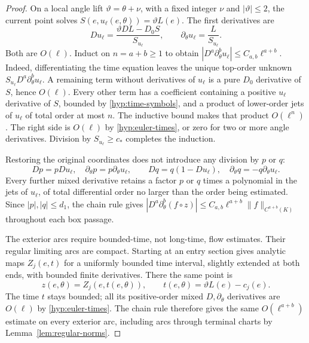 \begin{proof}
On a local angle lift $\vartheta=\theta+\nu$, with a fixed integer
$\nu$ and $|\vartheta|\le2$, the current point solves
$S(e,u_\ell(e,\theta))=\vartheta L(e)$.  The first derivatives are
\[
 Du_\ell=\frac{\vartheta DL-D_0S}{S_{u_\ell}},\qquad
 \partial_\theta u_\ell=\frac{L}{S_{u_\ell}}.
\]
Both are $O(\ell)$.  Induct on $n=a+b\ge1$ to obtain
$|D^a\partial_\theta^b u_\ell|\le C_{a,b}\ell^{a+b}$.
Indeed, differentiating the time equation leaves the unique top-order
unknown $S_{u_\ell}D^a\partial_\theta^bu_\ell$.  A remaining term without
derivatives of $u_\ell$ is a pure $D_0$ derivative of $S$, hence $O(\ell)$.
Every other term has a coefficient containing a positive $u_\ell$
derivative of $S$, bounded by \eqref{hyp:time-symbols}, and a product
of lower-order jets of $u_\ell$ of total order at most $n$.  The inductive
bound makes that product $O(\ell^n)$.  The right side is $O(\ell)$
by \eqref{hyp:euler-times}, or zero for two or more angle derivatives.
Division by $S_{u_\ell}\ge c_*$ completes the induction.

Restoring the original coordinates does not introduce any division by
$p$ or $q$:
\[
 Dp=pDu_\ell,\quad \partial_\theta p=p\partial_\theta u_\ell,\qquad
 Dq=q(1-Du_\ell),\quad \partial_\theta q=-q\partial_\theta u_\ell.
\]
Every further mixed derivative retains a factor $p$ or $q$ times a
polynomial in the jets of $u_\ell$, of total differential order no larger
than the order being estimated.  Since $|p|,|q|\le d_1$, the chain
rule gives
$|D^a\partial_\theta^b(f\circ z)|
 \le C_{a,b}\ell^{a+b}\|f\|_{C^{a+b}(K)}$ throughout each box passage.

The exterior arcs require bounded-time, not long-time, flow estimates.
Their regular limiting arcs are compact.  Starting at an entry section
gives analytic maps $Z_j(e,t)$ for a uniformly bounded time interval,
slightly extended at both ends, with bounded finite derivatives.
There the same point is
\[
 z(e,\theta)=Z_j(e,t(e,\theta)),\qquad
 t(e,\theta)=\vartheta L(e)-c_j(e).
\]
The time $t$ stays bounded; all its positive-order mixed $D,\partial_\theta$
derivatives are $O(\ell)$ by \eqref{hyp:euler-times}.  The chain rule
therefore gives the same $O(\ell^{a+b})$ estimate on every exterior
arc, including arcs through terminal charts by
Lemma~\ref{lem:regular-norms}.


\end{proof}
